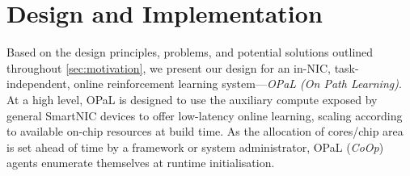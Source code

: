 \documentclass[
sigconf,natbib=false
]{acmart}
\newcommand{\approach}{On Path Learning}
\newcommand{\approachshort}{OPaL}
\newcommand{\Coopfw}{\emph{CoOp}}
\newcounter{insightc}
\newenvironment{insight}
	{
		\begin{tipblock}\refstepcounter{insightc}\textbf{Insight \theinsightc:}\em
	}
	{
		\end{tipblock}
	}
\begin{document}



\section{Design and Implementation}\label{sec:design}
Based on the design principles, problems, and potential solutions outlined throughout \cref{sec:motivation}, we present our design for an in-NIC, task-independent, online reinforcement learning system---\emph{\approachshort{} (\approach)}.
At a high level, \approachshort{} is designed to use the auxiliary compute exposed by general SmartNIC devices to offer low-latency online learning, scaling according to available on-chip resources at build time.
As the allocation of cores/chip area is set ahead of time by a framework or system administrator, \approachshort{} (\Coopfw) agents enumerate themselves at runtime initialisation.
\end{document}

